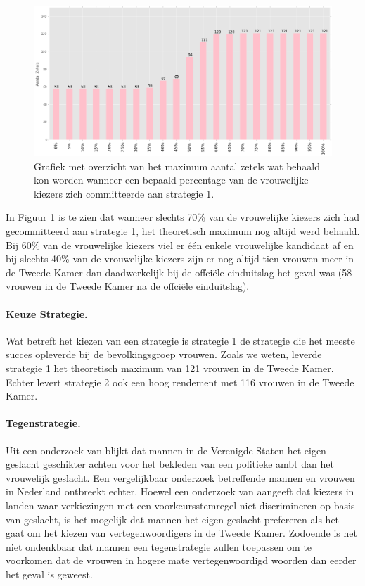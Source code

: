 \begin{figure}[H]


	\includegraphics[width=\linewidth]{percentages_van_vrouwen.png}

			\caption{Grafiek met overzicht van het maximum aantal zetels wat behaald kon worden wanneer een bepaald percentage van de vrouwelijke kiezers zich committeerde aan strategie 1.}

\label{fig:PerV}
\end{figure}

In Figuur \ref{fig:PerV} is te zien dat wanneer slechts 70\% van de vrouwelijke kiezers zich had gecommitteerd aan strategie 1, het theoretisch maximum nog altijd werd behaald. Bij 60\% van de vrouwelijke kiezers viel er één enkele vrouwelijke kandidaat af en bij slechts 40\% van de vrouwelijke kiezers zijn er nog altijd tien vrouwen meer in de Tweede Kamer dan daadwerkelijk bij de offci\"{e}le einduitslag het geval was (58 vrouwen in de Tweede Kamer na de offci\"{e}le einduitslag). 

\paragraph{Keuze Strategie.}
Wat betreft het kiezen van een strategie is strategie 1 de strategie die het meeste succes opleverde bij de bevolkingsgroep vrouwen. Zoals we weten, leverde strategie 1 het theoretisch maximum van 121 vrouwen in de Tweede Kamer. Echter levert strategie 2 ook een hoog rendement met 116 vrouwen in de Tweede Kamer. 

\paragraph{Tegenstrategie.}
Uit een onderzoek van \cite{lawless2012men} blijkt dat mannen in de Verenigde Staten het eigen geslacht geschikter achten voor het bekleden van een politieke ambt dan het vrouwelijk geslacht. Een vergelijkbaar onderzoek betreffende mannen en vrouwen in Nederland ontbreekt echter. Hoewel een onderzoek van \cite{mcelroy2009candidate} aangeeft dat kiezers in landen waar verkiezingen met een voorkeursstemregel niet discrimineren op basis van geslacht, is het mogelijk dat mannen het eigen geslacht prefereren als het gaat om het kiezen van vertegenwoordigers in de Tweede Kamer. Zodoende is het niet ondenkbaar dat mannen een tegenstrategie zullen toepassen om te voorkomen dat de vrouwen in hogere mate vertegenwoordigd woorden dan eerder het geval is geweest. 

